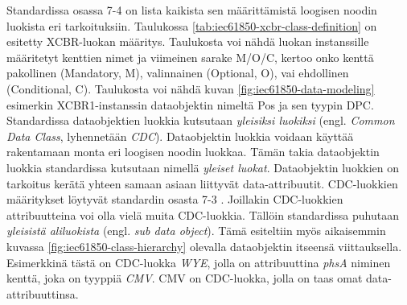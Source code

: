 Standardissa osassa 7-4 on lista kaikista sen määrittämistä loogisen noodin luokista eri tarkoituksiin. Taulukossa \ref{tab:iec61850-xcbr-class-definition} on esitetty XCBR-luokan määritys. Taulukosta voi nähdä luokan instanssille määritetyt kenttien nimet ja viimeinen sarake M/O/C, kertoo onko kenttä pakollinen (Mandatory, M), valinnainen (Optional, O), vai ehdollinen (Conditional, C). Taulukosta voi nähdä kuvan \ref{fig:iec61850-data-modeling} esimerkin XCBR1-instanssin dataobjektin nimeltä Pos ja sen tyypin DPC. Standardissa dataobjektien luokkia kutsutaan \emph{yleisiksi luokiksi} (engl. \emph{Common Data Class}, lyhennetään \emph{CDC}). Dataobjektin luokkia voidaan käyttää rakentamaan monta eri loogisen noodin luokkaa. Tämän takia dataobjektin luokkia standardissa kutsutaan nimellä \emph{yleiset luokat}. Dataobjektin luokkien on tarkoitus kerätä yhteen samaan asiaan liittyvät data-attribuutit. CDC-luokkien määritykset löytyvät standardin osasta 7-3 \mbox{\cite[s.~26]{IEC61850-1}}. Joillakin CDC-luokkien attribuutteina voi olla vielä muita CDC-luokkia. Tällöin standardissa puhutaan \emph{yleisistä aliluokista} (engl. \emph{sub data object}). Tämä esiteltiin myös aikaisemmin kuvassa \ref{fig:iec61850-class-hierarchy} olevalla dataobjektin itseensä viittauksella. Esimerkkinä tästä on CDC-luokka \emph{WYE}, jolla on attribuuttina \emph{phsA} niminen kenttä, joka on tyyppiä \emph{CMV}. CMV on CDC-luokka, jolla on taas omat data-attribuuttinsa. \mbox{\cite[s.~51,61]{IEC61850-7-2}} \mbox{\cite[s.~36]{IEC61850-7-3}}

